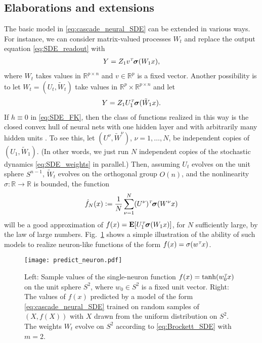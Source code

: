 \documentclass[letterpaper, 10pt, conference]{ieeeconf}
\def\Reals{{\mathbb R}}
\def\Ex{{\mathbf E}} %
\def\trn{{\hbox{\it\tiny T}}} %
\def\deq{:=}
\begin{document}
\subsection{Elaborations and extensions}

The basic model in \eqref{eq:cascade_neural_SDE} can be extended in various ways. For instance, we can consider matrix-valued processes $W_t$ and replace the output equation \eqref{eq:SDE_readout} with
\begin{align*}
	Y = Z_1 v^\trn \boldsymbol{\sigma}(W_1 x),
\end{align*}
where $W_t$ takes values in $\Reals^{p \times n}$ and $v \in \Reals^p$ is a fixed  vector. Another possibility is to let $W_t = (U_t,\tilde{W}_t)$ take values in $\Reals^p \times \Reals^{p \times n}$ and let
\begin{align*}%
	Y = Z_1 U_1^\trn \boldsymbol{\sigma}(\tilde{W}_1 x).
\end{align*}
If $h \equiv 0$ in \eqref{eq:SDE_FK}, then the class of functions realized in this way is the closed convex hull of neural nets with one hidden layer and with arbitrarily many hidden units \cite{Gurvits97approximation}. To see this, let $(U^\nu,\tilde{W}^\nu)$, $\nu = 1,\dots,N$, be independent copies of $(U_1,\tilde{W}_1)$. (In other words, we just run $N$ independent copies of the stochastic dynamics \eqref{eq:SDE_weights} in parallel.) Then, assuming $U_t$ evolves on the unit sphere $S^{n-1}$, $\tilde{W}_t$ evolves on the orthogonal group $O(n)$, and the nonlinearity $\sigma : \Reals \to \Reals$ is bounded, the function
\begin{align*}
	\hat{f}_N(x) \deq \frac{1}{N}\sum^N_{\nu = 1} (U^\nu)^\trn \boldsymbol{\sigma}(W^\nu x)
\end{align*}
will be a good approximation of $f(x) = \Ex[U^\trn_1 \boldsymbol{\sigma}(W_1x)]$, for $N$ sufficiently large, by the law of large numbers. Fig.~\ref{fig:predict_neuron} shows a simple illustration of the ability of such models to realize neuron-like functions of the form $f(x) = \sigma(w^\trn x)$.
\begin{figure}[t]
	\texttt{[image: predict\_neuron.pdf]}
	{\small \caption{Left: Sample values of the single-neuron function $f(x) = \tanh(w^\trn_0 x)$ on the unit sphere $S^2$, where $w_0 \in S^2$ is a fixed unit vector. Right: The values of $f(x)$ predicted by a model of the form \eqref{eq:cascade_neural_SDE} trained on random samples of $(X,f(X))$ with $X$ drawn from the uniform distribution on $S^2$. The weights $W_t$ evolve on $S^2$ according to \eqref{eq:Brockett_SDE} with $m = 2$.}\label{fig:predict_neuron}}
\end{figure}
\end{document}
